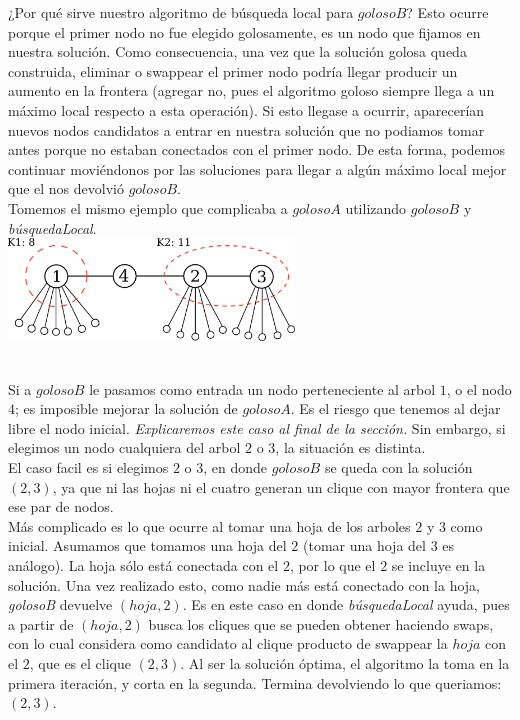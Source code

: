 ¿Por qué sirve nuestro algoritmo de búsqueda local para $golosoB$? Esto ocurre porque el primer nodo no fue elegido golosamente, es un nodo que fijamos en nuestra solución. Como consecuencia, una vez que la solución golosa queda construida, eliminar o swappear el primer nodo podría llegar producir un aumento en la frontera (agregar no, pues el algoritmo goloso siempre llega a un máximo local respecto a esta operación). Si esto llegase a ocurrir, aparecerían nuevos nodos candidatos a entrar en nuestra solución que no podiamos tomar antes porque no estaban conectados con el primer nodo. De esta forma, podemos continuar moviéndonos por las soluciones para llegar a algún máximo local mejor que el nos devolvió $golosoB$. \\

Tomemos el mismo ejemplo que complicaba a $golosoA$ utilizando $golosoB$ y \textit{búsquedaLocal}. \\

{\centering
    \includegraphics[width=0.57\textwidth]{informe/imgs/greedy_base_nodes_v2.png} \\
}
$ $\newline

Si a $golosoB$ le pasamos como entrada un nodo perteneciente al arbol $1$, o el nodo $4$; es imposible mejorar la solución de $golosoA$. Es el riesgo que tenemos al dejar libre el nodo inicial. \textit{Explicaremos este caso al final de la sección.} Sin embargo, si elegimos un nodo cualquiera del arbol $2$ o $3$, la situación es distinta. \\

El caso facil es si elegimos $2$ o $3$, en donde $golosoB$ se queda con la solución $(2,3)$, ya que ni las hojas ni el cuatro generan un clique con mayor frontera que ese par de nodos. \\

Más complicado es lo que ocurre al tomar una hoja de los arboles $2$ y $3$ como inicial. Asumamos que tomamos una hoja del $2$ (tomar una hoja del $3$ es análogo). La hoja sólo está conectada con el $2$, por lo que el $2$ se incluye en la solución. Una vez realizado esto, como nadie más está conectado con la hoja, \textit{golosoB} devuelve $(hoja,2)$. Es en este caso en donde \textit{búsquedaLocal} ayuda, pues a partir de $(hoja,2)$ busca los cliques que se pueden obtener haciendo swaps, con lo cual considera como candidato al clique producto de swappear la $hoja$ con el $2$, que es el clique $(2,3)$. Al ser la solución óptima, el algoritmo la toma en la primera iteración, y corta en la segunda. Termina devolviendo lo que queriamos: $(2,3)$. \\

